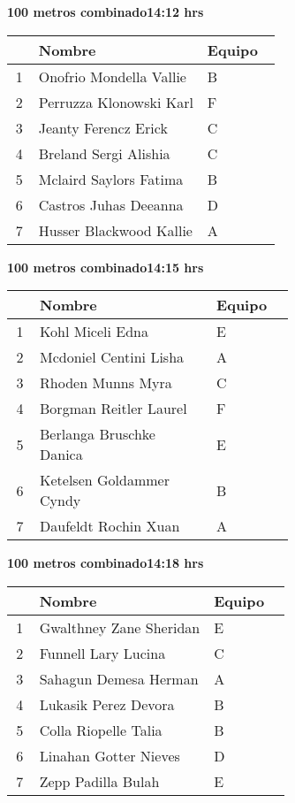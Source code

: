\begin{minipage}{0.95\linewidth}
\begin{center}
\textbf{
100 metros combinado\hspace{1cm}14:12 hrs}
\end{center}
\begin{tabular}{cp{0.63\linewidth}l}
\hline
& \textbf{Nombre} & \textbf{Equipo} \\ \hline
1 & Onofrio Mondella Vallie & B \\ 
2 & Perruzza Klonowski Karl & F \\ 
3 & Jeanty Ferencz Erick & C \\ 
4 & Breland Sergi Alishia & C \\ 
5 & Mclaird Saylors Fatima & B \\ 
6 & Castros Juhas Deeanna & D \\ 
7 & Husser Blackwood Kallie & A \\ 
\end{tabular}
\end{minipage}
\begin{minipage}{0.95\linewidth}
\begin{center}
\textbf{
100 metros combinado\hspace{1cm}14:15 hrs}
\end{center}
\begin{tabular}{cp{0.63\linewidth}l}
\hline
& \textbf{Nombre} & \textbf{Equipo} \\ \hline
1 & Kohl Miceli Edna & E \\ 
2 & Mcdoniel Centini Lisha & A \\ 
3 & Rhoden Munns Myra & C \\ 
4 & Borgman Reitler Laurel & F \\ 
5 & Berlanga Bruschke Danica & E \\ 
6 & Ketelsen Goldammer Cyndy & B \\ 
7 & Daufeldt Rochin Xuan & A \\ 
\end{tabular}
\end{minipage}
\begin{minipage}{0.95\linewidth}
\begin{center}
\textbf{
100 metros combinado\hspace{1cm}14:18 hrs}
\end{center}
\begin{tabular}{cp{0.63\linewidth}l}
\hline
& \textbf{Nombre} & \textbf{Equipo} \\ \hline
1 & Gwalthney Zane Sheridan & E \\ 
2 & Funnell Lary Lucina & C \\ 
3 & Sahagun Demesa Herman & A \\ 
4 & Lukasik Perez Devora & B \\ 
5 & Colla Riopelle Talia & B \\ 
6 & Linahan Gotter Nieves & D \\ 
7 & Zepp Padilla Bulah & E \\ 
\end{tabular}
\end{minipage}
